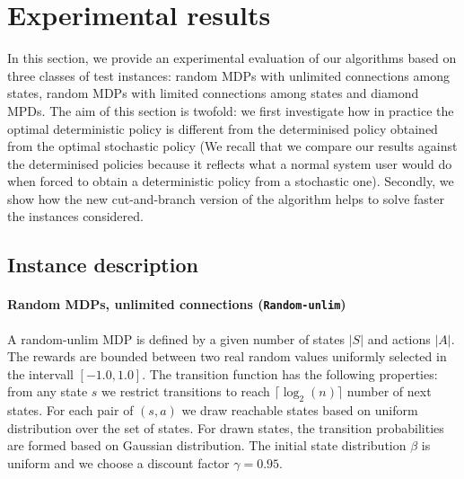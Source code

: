 \section{Experimental results}\label{sec:experiments}

In this section, we provide an experimental evaluation of our algorithms based on three classes of test instances: %
random MDPs with unlimited connections among states, random MDPs with limited connections among states and diamond MPDs.  
The aim of this section is twofold: we first investigate how in practice the optimal deterministic policy is different from the determinised policy obtained from the optimal stochastic policy (We recall that we compare our results against the determinised policies because it reflects what a normal system user would do when forced to obtain a deterministic policy from a stochastic one).
Secondly, we show how the new cut-and-branch version of the algorithm helps to solve faster the instances considered.




\subsection{Instance description}
\paragraph{Random MDPs, unlimited connections (\texttt{Random-unlim})}
A random-unlim MDP is defined by a given number of states $|S|$ and actions $|A|$. The rewards are bounded between two real random values uniformly selected in the intervall $[-1.0,1.0]$. 
The transition function has the following properties: from any state $s$ we restrict transitions to reach $\lceil \log_2(n) \rceil$ number of next states. 
For each pair of $(s, a)$ we draw reachable states based on uniform distribution over the set of states. For drawn states, the transition probabilities are formed based on Gaussian distribution. The initial state distribution $\beta$ is uniform and we choose a discount factor $\gamma = 0.95$. 
